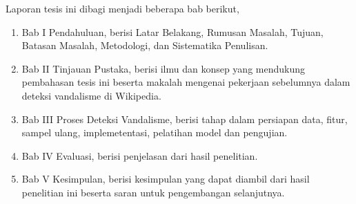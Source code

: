Laporan tesis ini dibagi menjadi beberapa bab berikut,
\begin{enumerate}
	\item Bab I Pendahuluan, berisi Latar Belakang, Rumusan Masalah,
	Tujuan, Batasan Masalah, Metodologi, dan Sistematika Penulisan.
	\item Bab II Tinjauan Pustaka, berisi ilmu dan konsep yang mendukung
	pembahasan tesis ini beserta makalah mengenai pekerjaan sebelumnya
	dalam deteksi vandalisme di Wikipedia.
	\item Bab III Proses Deteksi Vandalisme, berisi tahap dalam persiapan
	data, fitur, sampel ulang, implemetentasi, pelatihan model dan
	pengujian.
	\item Bab IV Evaluasi, berisi penjelasan dari hasil penelitian.
	\item Bab V Kesimpulan, berisi kesimpulan yang dapat diambil dari hasil
	penelitian ini beserta saran untuk pengembangan selanjutnya.
\end{enumerate}
